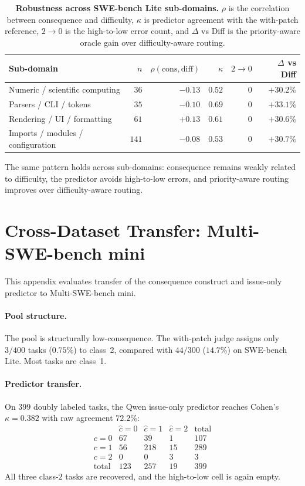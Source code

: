 \documentclass{article}
\begin{document}
\begin{table}[h]
\centering
\caption{\textbf{Robustness across SWE-bench Lite sub-domains.}
$\rho$ is the correlation between consequence and difficulty,
$\kappa$ is predictor agreement with the with-patch reference,
$2\to0$ is the high-to-low error count, and $\Delta$ vs Diff is the
priority-aware oracle gain over difficulty-aware routing.}
\label{tab:subdomain}
\small
\begin{tabular}{lrrrrr}
\toprule
Sub-domain & $n$ & $\rho(\mathrm{cons},\mathrm{diff})$ & $\kappa$ & $2\to0$ & $\Delta$ vs Diff \\
\midrule
Numeric / scientific computing    & $36$  & $-0.13$ & $0.52$ & $0$ & $+30.2\%$ \\
Parsers / CLI / tokens            & $35$  & $-0.10$ & $0.69$ & $0$ & $+33.1\%$ \\
Rendering / UI / formatting       & $61$  & $+0.13$ & $0.61$ & $0$ & $+30.6\%$ \\
Imports / modules / configuration & $141$ & $-0.08$ & $0.53$ & $0$ & $+30.7\%$ \\
\bottomrule
\end{tabular}
\end{table}

The same pattern holds across sub-domains: consequence remains weakly
related to difficulty, the predictor avoids high-to-low errors, and
priority-aware routing improves over difficulty-aware routing.

\section{Cross-Dataset Transfer: Multi-SWE-bench mini}
\label{app:crossdataset}

This appendix evaluates transfer of the consequence construct and
issue-only predictor to Multi-SWE-bench mini.

\paragraph{Pool structure.}
The pool is structurally low-consequence. The with-patch judge assigns
only $3/400$ tasks ($0.75\%$) to class~2, compared with $44/300$
($14.7\%$) on SWE-bench Lite. Most tasks are class~1.

\paragraph{Predictor transfer.}
On $399$ doubly labeled tasks, the Qwen issue-only predictor reaches
Cohen's $\kappa=0.382$ with raw agreement $72.2\%$:
\[
\begin{array}{c|ccc|c}
& \hat{c}=0 & \hat{c}=1 & \hat{c}=2 & \text{total} \\\hline
c=0 & 67 & 39 & 1 & 107 \\
c=1 & 56 & 218 & 15 & 289 \\
c=2 & 0 & 0 & 3 & 3 \\\hline
\text{total} & 123 & 257 & 19 & 399
\end{array}
\]
All three class-$2$ tasks are recovered, and the high-to-low cell is
again empty.
\end{document}
